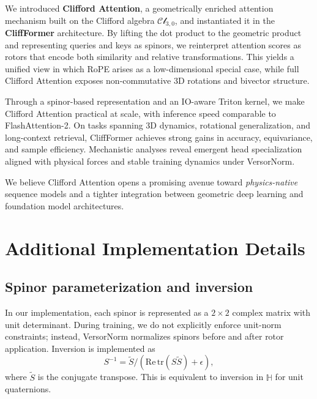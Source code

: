 \documentclass{article}
\theoremstyle{plain}
\theoremstyle{definition}
\theoremstyle{remark}
\newcommand{\cliff}{\mathcal{Cl}}
\newcommand{\Hq}{\mathbb{H}}
\begin{document}
We introduced \textbf{Clifford Attention}, a geometrically enriched attention mechanism built on the Clifford algebra $\cliff_{3,0}$, and instantiated it in the \textbf{CliffFormer} architecture. By lifting the dot product to the geometric product and representing queries and keys as spinors, we reinterpret attention scores as rotors that encode both similarity and relative transformations. This yields a unified view in which RoPE arises as a low-dimensional special case, while full Clifford Attention exposes non-commutative 3D rotations and bivector structure.

Through a spinor-based representation and an IO-aware Triton kernel, we make Clifford Attention practical at scale, with inference speed comparable to FlashAttention-2. On tasks spanning 3D dynamics, rotational generalization, and long-context retrieval, CliffFormer achieves strong gains in accuracy, equivariance, and sample efficiency. Mechanistic analyses reveal emergent head specialization aligned with physical forces and stable training dynamics under VersorNorm.

We believe Clifford Attention opens a promising avenue toward \emph{physics-native} sequence models and a tighter integration between geometric deep learning and foundation model architectures.




\newpage
\appendix
\onecolumn

\section{Additional Implementation Details}

\subsection{Spinor parameterization and inversion}

In our implementation, each spinor is represented as a $2\times2$ complex matrix with unit determinant. During training, we do not explicitly enforce unit-norm constraints; instead, VersorNorm normalizes spinors before and after rotor application. Inversion is implemented as
\begin{equation}
    S^{-1} = \tilde{S} / (\mathrm{Re}\,\mathrm{tr}(S\tilde{S}) + \epsilon),
\end{equation}
where $\tilde{S}$ is the conjugate transpose. This is equivalent to inversion in $\Hq$ for unit quaternions.
\end{document}
